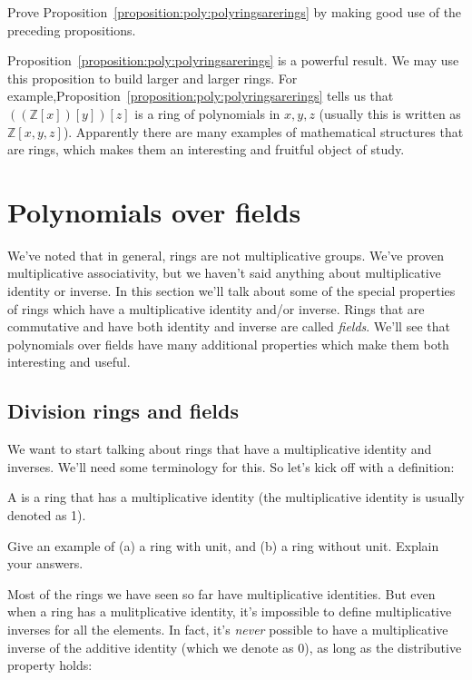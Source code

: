 \begin{exercise}{}
Prove Proposition~\ref{proposition:poly:polyringsarerings} by making good use of the preceding propositions.
\end{exercise}

Proposition~\ref{proposition:poly:polyringsarerings} is a powerful result. We may use this proposition to build larger and larger rings. For example,Proposition~\ref{proposition:poly:polyringsarerings} tells us that $((\mathbb{Z}[x])[y])[z]$ is a ring of polynomials in $x,y,z$  (usually this is written as $\mathbb{Z}[x,y,z]$). Apparently there are many examples of mathematical structures that are rings, which makes them an interesting and fruitful object of study.

\section{Polynomials over fields}

We've noted that in general, rings are not multiplicative groups.  We've proven multiplicative associativity, but we haven't said anything about multiplicative identity or inverse. In this section we'll talk about some of the special properties of rings which have a multiplicative  identity and/or inverse. Rings that are commutative and have both identity and inverse are called \emph{fields}.  We'll see that polynomials over fields have many additional properties which make them both interesting and useful.

\subsection{Division rings and fields\quad
{}}


We want to start talking about rings that have a multiplicative identity and inverses.  We'll need some terminology for this. So let's kick off with a definition:

\begin{defn}
A  is a ring that has a multiplicative identity (the multiplicative identity is usually denoted as 1).
\end{defn}

\begin{exercise}{}
Give an example of (a) a ring with unit, and (b) a ring without unit. Explain your answers.
\end{exercise}
Most of the rings we have seen so far have multiplicative identities. But even when a ring has a mulitplicative identity, it's impossible to define multiplicative inverses for all the elements. In fact, it's  \emph{never} possible to  have a multiplicative inverse of the additive identity (which we denote as 0), as long as the distributive property holds:

